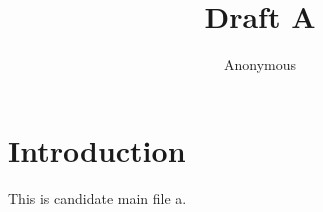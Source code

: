 \documentclass{article}
\title{Draft A}
\author{Anonymous}
\begin{document}
\maketitle

\section{Introduction}
This is candidate main file a.
\end{document}
